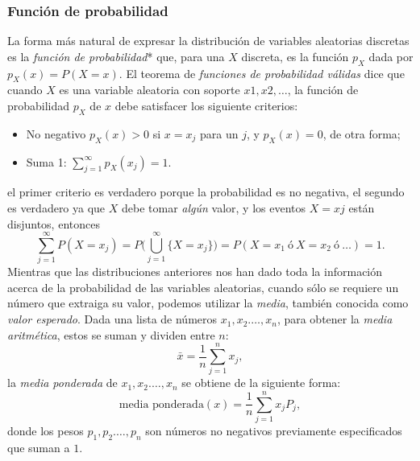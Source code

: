 \subsubsection {Función de probabilidad}
La forma más natural de expresar la distribución de variables aleatorias discretas es la \emph{función de probabilidad}\cite{blitz19}* que, para una $X$ discreta, es la función $p_X$ dada por $p_X(x)=P(X=x)$. El teorema de \emph{funciones de probabilidad válidas} dice que cuando $X$ es una variable aleatoria con soporte $x1,x2,\ldots$, la función de probabilidad $p_X$ de $x$ debe satisfacer los siguiente criterios:
\begin{itemize}
	\item No negativo $p_X (x) > 0$ si $x=x_j$ para un $j$, y $p_X(x)=0$, de otra forma;
	\item Suma 1: $\sum_{j=1}^{\infty}p_X(x_j)=1$.
\end{itemize}
el primer criterio es verdadero porque la probabilidad es no negativa, el segundo es verdadero ya que $X$ debe tomar \emph{algún} valor, y los eventos ${X=xj}$ están disjuntos, entonces
\begin{equation}
\sum_{j=1}^{\infty}P(X=x_j)=P\bigg(\bigcup_{j=1}^{\infty}\{X=x_j\}\bigg)=P(X=x_1\ \text{ó}\ X=x_2\ \text{ó}\ \ldots)=1.
\end{equation}
Mientras que las distribuciones anteriores nos han dado toda la información acerca de la probabilidad de las variables aleatorias, cuando sólo se requiere un número que extraiga su valor, podemos utilizar la \emph{media}, también conocida como \emph{valor esperado}. Dada una lista de números $x_1,x_2.\ldots,x_n$, para obtener la \emph{media aritmética}, estos se suman y dividen entre $n$:
\begin{equation}
\bar{x}=\frac{1}{n}\sum_{j=1}^{n}x_j,
\end{equation}
la \emph{media ponderada} de $x_1,x_2.\ldots,x_n$ se obtiene de la siguiente forma:
\begin{equation}
\text{media ponderada}(x)=\frac{1}{n}\sum_{j=1}^{n}x_jP_j,
\end{equation}
donde los pesos $p_1,p_2.\ldots,p_n$ son números no negativos previamente especificados que suman a $1$.
